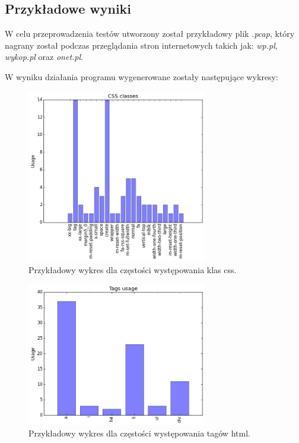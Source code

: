 \documentclass[12pt]{article}
\begin{document}
\subsection{Przykładowe wyniki}
W celu przeprowadzenia testów utworzony został przykładowy plik \emph{.pcap}, który nagrany został podczas przeglądania stron internetowych takich jak: \emph{wp.pl}, \emph{wykop.pl} oraz \emph{onet.pl}. 

W wyniku działania programu wygenerowane zostały następujące wykresy:

\begin{figure}[h]
\centering
\caption{Przykładowy wykres dla częstości występowania klas css.}
\label{img:wykresCss}
\includegraphics[width=0.7\textwidth]{WykresCss.png}
\end{figure}

\begin{figure}[h]
\centering
\caption{Przykładowy wykres dla częstości występowania tagów html.}
\label{img:wykresTagi}
\includegraphics[width=0.7\textwidth]{WykresTagi.png}
\end{figure}
\end{document}

